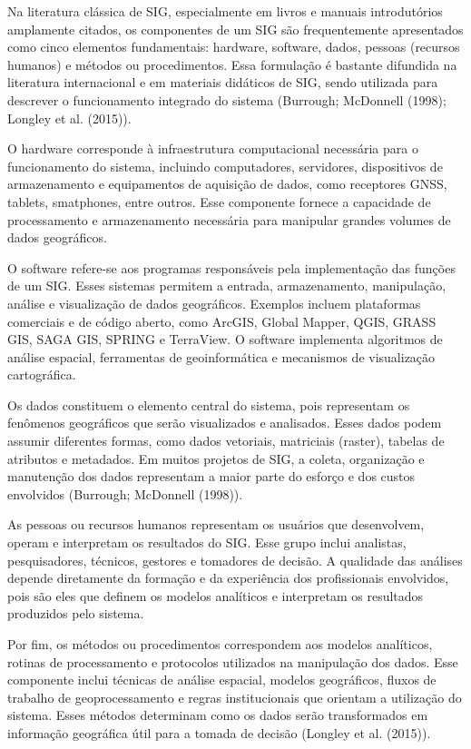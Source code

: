\documentclass[
  letterpaper,
  DIV=11,
  numbers=noendperiod]{scrreprt}
\begin{document}
Na literatura clássica de SIG, especialmente em livros e manuais
introdutórios amplamente citados, os componentes de um SIG são
frequentemente apresentados como cinco elementos fundamentais: hardware,
software, dados, pessoas (recursos humanos) e métodos ou procedimentos.
Essa formulação é bastante difundida na literatura internacional e em
materiais didáticos de SIG, sendo utilizada para descrever o
funcionamento integrado do sistema (Burrough; McDonnell (1998); Longley
et al. (2015)).

O hardware corresponde à infraestrutura computacional necessária para o
funcionamento do sistema, incluindo computadores, servidores,
dispositivos de armazenamento e equipamentos de aquisição de dados, como
receptores GNSS, tablets, smatphones, entre outros. Esse componente
fornece a capacidade de processamento e armazenamento necessária para
manipular grandes volumes de dados geográficos.

O software refere-se aos programas responsáveis pela implementação das
funções de um SIG. Esses sistemas permitem a entrada, armazenamento,
manipulação, análise e visualização de dados geográficos. Exemplos
incluem plataformas comerciais e de código aberto, como ArcGIS, Global
Mapper, QGIS, GRASS GIS, SAGA GIS, SPRING e TerraView. O software
implementa algoritmos de análise espacial, ferramentas de geoinformática
e mecanismos de visualização cartográfica.

Os dados constituem o elemento central do sistema, pois representam os
fenômenos geográficos que serão visualizados e analisados. Esses dados
podem assumir diferentes formas, como dados vetoriais, matriciais
(raster), tabelas de atributos e metadados. Em muitos projetos de SIG, a
coleta, organização e manutenção dos dados representam a maior parte do
esforço e dos custos envolvidos (Burrough; McDonnell (1998)).

As pessoas ou recursos humanos representam os usuários que desenvolvem,
operam e interpretam os resultados do SIG. Esse grupo inclui analistas,
pesquisadores, técnicos, gestores e tomadores de decisão. A qualidade
das análises depende diretamente da formação e da experiência dos
profissionais envolvidos, pois são eles que definem os modelos
analíticos e interpretam os resultados produzidos pelo sistema.

Por fim, os métodos ou procedimentos correspondem aos modelos
analíticos, rotinas de processamento e protocolos utilizados na
manipulação dos dados. Esse componente inclui técnicas de análise
espacial, modelos geográficos, fluxos de trabalho de geoprocessamento e
regras institucionais que orientam a utilização do sistema. Esses
métodos determinam como os dados serão transformados em informação
geográfica útil para a tomada de decisão (Longley et al. (2015)).
\end{document}
